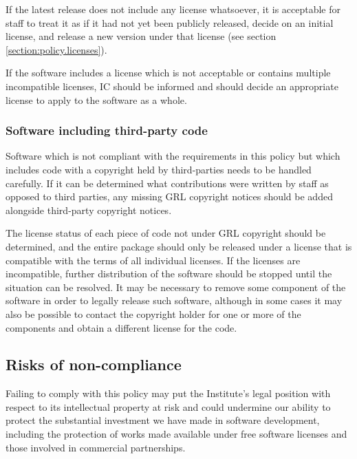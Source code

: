 \documentclass[10pt,a4paper]{article}
\begin{document}
\par If the latest release does not include any license whatsoever, it is 
acceptable for staff to treat it as if it had not yet been publicly released, decide 
on an initial license, and release a new version under that license 
(see section \ref{section:policy.licenses}). 

\par If the software includes a license which is not acceptable or contains 
multiple incompatible licenses, IC should be informed and should decide an 
appropriate license to apply to the software as a whole. 

\subsubsection{Software including third-party code}
\label{section:impnotes.oldcode.thirdparty}

\par Software which is not compliant with the requirements in this policy but 
which includes code with a copyright held by third-parties needs to be handled 
carefully. If it can be determined what contributions were written by staff as 
opposed to third parties, any missing GRL copyright notices should be added 
alongside third-party copyright notices. 

\par The license status of each piece of code not under GRL copyright should 
be determined, and the entire package should only be released under a license 
that is compatible with the terms of all individual licenses. If the licenses are 
incompatible, further distribution of the software should be stopped until the 
situation can be resolved. It may be necessary to remove some component of 
the software in order to legally release such software, although in some cases 
it may also be possible to contact the copyright holder for one or more of the 
components and obtain a different license for the code. 



\subsection{Risks of non-compliance}
\label{section:policy.copyright.risks}
\par Failing to comply with this policy may put the Institute's legal position with 
respect to its intellectual property at risk and could undermine our ability to protect 
the substantial investment we have made in software development, including 
the protection of works made available under free software licenses and those 
involved in commercial partnerships. 
\end{document}
